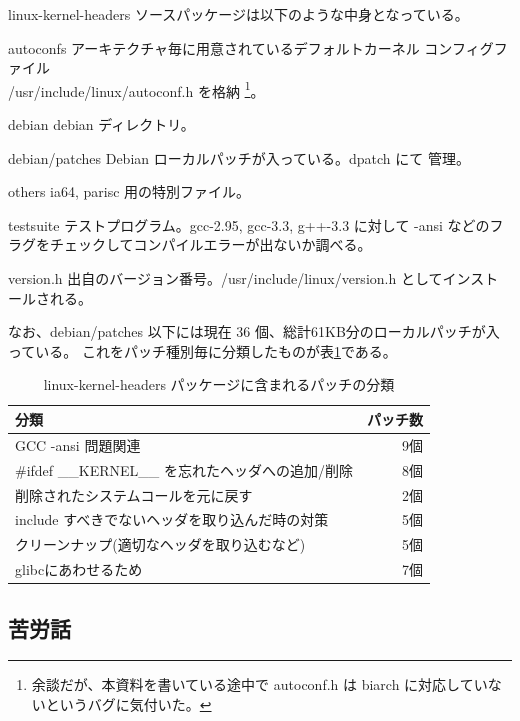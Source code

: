 \documentclass[mingoth]{jsarticle}
\newenvironment{gdescription}%
{%
   \begin{list}{}%
   {%
      \setlength{\itemindent}{0mm}
      \setlength{\leftmargin}{45mm}%
      \setlength{\rightmargin}{0zw}%
      \setlength{\labelsep}{4mm}%
      \setlength{\labelwidth}{4cm}%
      \setlength{\itemsep}{0em}%
      \setlength{\parsep}{0cm}%
      \setlength{\listparindent}{0cm}%
      \let\makelabel\gdescriptionlabel
   }
}{%
   \end{list}%
}
\newcommand*\gdescriptionlabel[1]{\hspace\labelsep\normalfont\bfseries #1}
\begin{document}
  linux-kernel-headers ソースパッケージは以下のような中身となっている。

  \begin{gdescription}
    \item[autoconfs] アーキテクチャ毎に用意されているデフォルトカーネル
	       コンフィグファイル\\
	       /usr/include/linux/autoconf.h を格納
	       \footnote{余談だが、本資料を書いている途中で autoconf.h
	       は biarch に対応していないというバグに気付いた。}。
    \item[debian] debian ディレクトリ。
    \item[debian/patches] Debian ローカルパッチが入っている。dpatch にて
	       管理。
    \item[others] ia64, parisc 用の特別ファイル。
    \item[testsuite] テストプログラム。gcc-2.95, gcc-3.3, g++-3.3 に対して -ansi などのフラグをチェックしてコンパイルエラーが出ないか調べる。
    \item[version.h] 出自のバージョン番号。/usr/include/linux/version.h としてインストールされる。
  \end{gdescription}

  なお、debian/patches 以下には現在 36 個、総計61KB分のローカルパッチが入っている。
  これをパッチ種別毎に分類したものが表\ref{lkh-patches}である。

  \begin{table}[h]
    \begin{center}
      {
	\begin{tabular}{l|r} \hline
		分類						& パッチ数 \\ \hline \hline
		GCC -ansi 問題関連				& 9個	\\
		\#ifdef \_\_KERNEL\_\_ を忘れたヘッダへの追加/削除	& 8個	\\
		削除されたシステムコールを元に戻す		& 2個	\\
		include すべきでないヘッダを取り込んだ時の対策	& 5個	\\
		クリーンナップ(適切なヘッダを取り込むなど)	& 5個	\\
		glibcにあわせるため				& 7個	\\ \hline
	   \end{tabular}
	}
        \caption{linux-kernel-headers パッケージに含まれるパッチの分類}
        \label{lkh-patches}
        \end{center}
        \end{table}

\subsection{苦労話}
\end{document}
